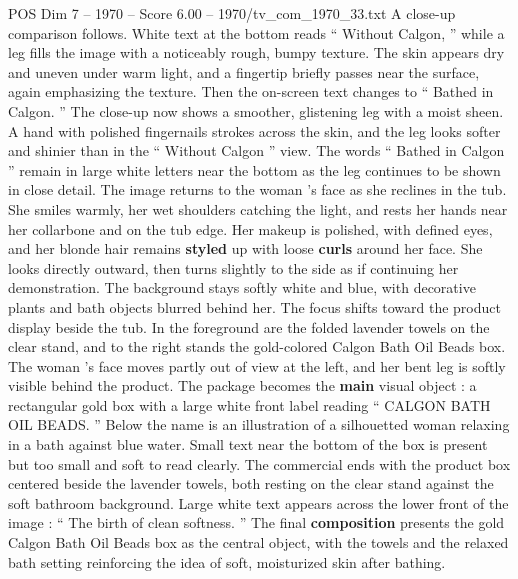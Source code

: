 \begin{textsample}{POS Dim 7 – 1970 – Score 6.00 – 1970/tv\_com\_1970\_33.txt}
A close-up comparison follows.
White text at the bottom reads “ Without Calgon, ” while a leg fills the image with a noticeably rough, bumpy texture.
The skin appears dry and uneven under warm light, and a fingertip briefly passes near the surface, again emphasizing the texture.
Then the on-screen text changes to “ Bathed in Calgon. ” The close-up now shows a smoother, glistening leg with a moist sheen.
A hand with polished fingernails strokes across the skin, and the leg looks softer and shinier than in the “ Without Calgon ” view.
The words “ Bathed in Calgon ” remain in large white letters near the bottom as the leg continues to be shown in close detail.
The image returns to the woman ’s face as she reclines in the tub.
She smiles warmly, her wet shoulders catching the light, and rests her hands near her collarbone and on the tub edge.
Her makeup is polished, with defined eyes, and her blonde hair remains \textbf{styled} up with loose \textbf{curls} around her face.
She looks directly outward, then turns slightly to the side as if continuing her demonstration.
The background stays softly white and blue, with decorative plants and bath objects blurred behind her.
The focus shifts toward the product display beside the tub.
In the foreground are the folded lavender towels on the clear stand, and to the right stands the gold-colored Calgon Bath Oil Beads box.
The woman ’s face moves partly out of view at the left, and her bent leg is softly visible behind the product.
The package becomes the \textbf{main} visual object : a rectangular gold box with a large white front label reading “ CALGON BATH OIL BEADS. ” Below the name is an illustration of a silhouetted woman relaxing in a bath against blue water.
Small text near the bottom of the box is present but too small and soft to read clearly.
The commercial ends with the product box centered beside the lavender towels, both resting on the clear stand against the soft bathroom background.
Large white text appears across the lower front of the image : “ The birth of clean softness. ” The final \textbf{composition} presents the gold Calgon Bath Oil Beads box as the central object, with the towels and the relaxed bath setting reinforcing the idea of soft, moisturized skin after bathing.

\end{textsample}
